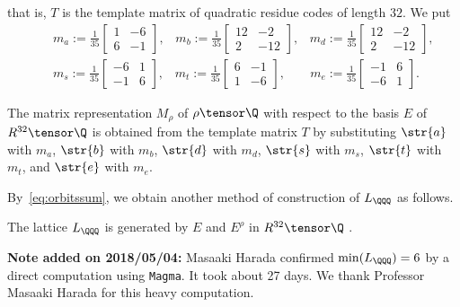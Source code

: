 \documentclass{amsart}
\begin{document}
that is, $T$ is the template matrix of quadratic residue codes of length $32$.
We put
%
\begin{eqnarray*}
&&
m_a:=\frac{1}{35}
\left[\begin{array}{cc} 
1 & -6 \\ 
6 & -1 
\end{array}\right],
\;\;\;
%
m_b:=\frac{1}{35}
\left[\begin{array}{cc} 
12 & -2 \\ 
2 & -12 
\end{array}\right],
\;\;\;
%
m_d:=\frac{1}{35}
\left[\begin{array}{cc} 
12 & -2 \\ 
2 & -12 
\end{array}\right],
\\
&&
%
m_s:=\frac{1}{35}
\left[\begin{array}{cc} 
-6 & 1 \\ 
-1 & 6 
\end{array}\right],
\;\;\;
%
m_t:=\frac{1}{35}
\left[\begin{array}{cc} 
6 & -1 \\ 
1 & -6 
\end{array}\right],
\;\;\;\;\;\;\;
%
m_e:=\frac{1}{35}
\left[\begin{array}{cc} 
-1 & 6 \\ 
-6 & 1 
\end{array}\right].
\end{eqnarray*}
%
\begin{proposition}
The matrix representation $M_{\rho}$ of $\rho\tensor\Q$ with respect to the basis $E$ of $R^{32}\tensor\Q$
is obtained from the template matrix $T$ by substituting
$\str{a}$ with $m_a$,
$\str{b}$ with $m_b$,
$\str{d}$ with $m_d$,
$\str{s}$ with $m_s$,
$\str{t}$ with $m_t$, and 
$\str{e}$ with $m_e$.
\end{proposition}
%
%
By~\eqref{eq:orbitssum},
we obtain another method of construction of $L_{\QQQ}$ as follows.
%
\begin{proposition}
The lattice $L_{\QQQ}$ is generated by $E$ and $E^{\rho}$ in $R^{32}\tensor\Q$ .
\end{proposition}
%
\par
\bigskip
{\bf Note added on 2018/05/04:}
Masaaki Harada confirmed $\min(L_{\QQQ})=6$ by a direct computation using {\tt Magma}.
It took about 27 days.
We thank Professor Masaaki Harada for this heavy computation.
%

%
\end{document}
